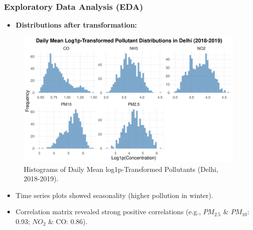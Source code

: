 \documentclass[svgnames, 12pt]{beamer}
\begin{document}
\begin{frame}
    \frametitle{Exploratory Data Analysis (EDA)}
    \begin{itemize}
        \item \textbf{Distributions after transformation:}
    \end{itemize}
    \begin{figure}
        \includegraphics[width=0.8\linewidth]{../analysis/assets/log1p_delhi_distributions.png}
        \caption{Histograms of Daily Mean log1p-Transformed Pollutants (Delhi, 2018-2019).}
        \label{fig:log_dist_delhi_pres}
    \end{figure}
    \begin{itemize}
        \item Time series plots showed seasonality (higher pollution in winter).
        \item Correlation matrix revealed strong positive correlations (e.g., $PM_{2.5}$ \& $PM_{10}$: 0.93; $NO_2$ \& CO: 0.86).
    \end{itemize}
\end{frame}
\end{document}
